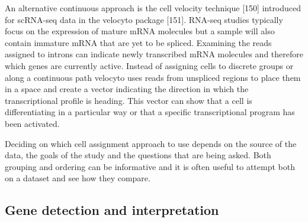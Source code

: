 \documentclass[11pt,a4paper,titlepage,twoside,openright]{style/unimelbthesis}
\theoremstyle{definition}
\theoremstyle{definition}
\theoremstyle{definition}
\theoremstyle{remark}
\begin{document}
\begin{mainmatter}
An alternative continuous approach is the cell velocity technique {[}150{]} introduced for scRNA-seq data in the velocyto package {[}151{]}. RNA-seq studies typically focus on the expression of mature mRNA molecules but a sample will also contain immature mRNA that are yet to be spliced. Examining the reads assigned to introns can indicate newly transcribed mRNA molecules and therefore which genes are currently active. Instead of assigning cells to discrete groups or along a continuous path velocyto uses reads from unspliced regions to place them in a space and create a vector indicating the direction in which the transcriptional profile is heading. This vector can show that a cell is differentiating in a particular way or that a specific transcriptional program has been activated.

Deciding on which cell assignment approach to use depends on the source of the data, the goals of the study and the questions that are being asked. Both grouping and ordering can be informative and it is often useful to attempt both on a dataset and see how they compare.

\hypertarget{gene-detection-and-interpretation}{%
\subsection{Gene detection and interpretation}\label{gene-detection-and-interpretation}}


\end{mainmatter}
\end{document}
